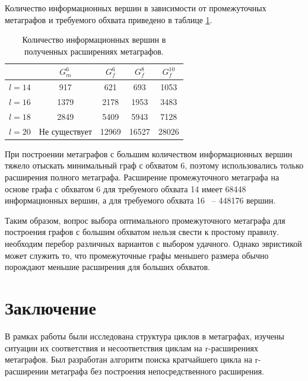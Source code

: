 \documentclass[14pt]{mmcs-article}
\begin{document}
Количество информационных вершин в зависимости от промежуточных метаграфов и требуемого обхвата приведено в таблице \ref{info_vertex_count_table_for_big_girth}. 

\begin{table}[H]
    \centering
    \begin{tabular}{ | c | c | c | c | c | }
        \hline
                   & $G_m^6$      & $G_f^6$     & $G_f^8$     & $G_f^{10}$  \\ \hline
        $ l = 14 $ & 917          & 621         & 693         & 1053        \\ \hline
        $ l = 16 $ & 1379         & 2178        & 1953        & 3483        \\ \hline
        $ l = 18 $ & 2849         & 5409        & 5943        & 7128        \\ \hline
        $ l = 20 $ & Не существует& 12969       & 16527       & 28026       \\ \hline
    \end{tabular}
    \caption{ Количество информационных вершин в полученных расширениях метаграфов. }
    \label{info_vertex_count_table_for_big_girth}
\end{table}

При построении метаграфов с большим количеством информационных вершин тяжело отыскать минимальный граф с обхватом 6, поэтому использовались только расширения полного метаграфа. Расширение промежуточного метаграфа на основе графа с обхватом 6 для требуемого обхвата 14 имеет 68448 информационных вершин, а для требуемого обхвата 16 ~-- 448176 вершин.

Таким образом, вопрос выбора оптимального промежуточного метаграфа для построения графов с большим обхватом нельзя свести к простому правилу. необходим перебор различных вариантов с выбором удачного. Однако эвристикой может служить то, что промежуточные графы меньшего размера обычно порождают меньшие расширения для больших обхватов.

\newpage

\section*{Заключение}

В рамках работы были исследована структура циклов в метаграфах, изучены ситуации их соответствия и несоответствия циклам на r-расширениях метаграфов. Был разработан алгоритм поиска кратчайшего цикла на r-расширении метаграфа без построения непосредственного расширения.
\end{document}
